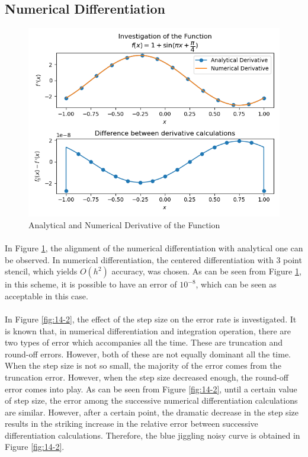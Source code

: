 \documentclass[letterpaper,12pt]{article}
\begin{document}
\subsection{Numerical Differentiation}
\begin{figure}[H]
\centerline{\includegraphics[width=\linewidth]{figures/14-1.png}}
\caption{Analytical and Numerical Derivative of the Function}
\label{fig:14-1}
\end{figure}

\paragraph{} In Figure \ref{fig:14-1}, the alignment of the numerical differentiation with analytical one can be observed. In numerical differentiation, the centered differentiation with 3 point stencil, which yields $O(h^2)$ accuracy, was chosen. As can be seen from Figure \ref{fig:14-1}, in this scheme, it is possible to have an error of $10^{-8}$, which can be seen as acceptable in this case.

\paragraph{} In Figure \ref{fig:14-2}, the effect of the step size on the error rate is investigated. It is known that, in numerical differentiation and integration operation, there are two types of error which accompanies all the time. These are truncation and round-off errors. However, both of these are not equally dominant all the time. When the step size is not so small, the majority of the error comes from the truncation error. However, when the  step size decreased enough, the round-off error comes into play. As can be seen from Figure \ref{fig:14-2}, until a certain value of step size, the error among the successive numerical differentiation calculations are similar. However, after a certain point, the dramatic decrease in the step size results in the striking increase in the relative error between successive differentiation calculations. Therefore, the blue jiggling noisy curve is obtained in Figure \ref{fig:14-2}.
\end{document}
